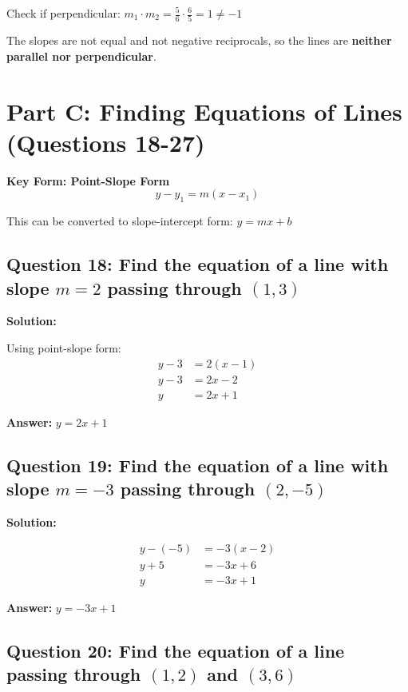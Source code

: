 \documentclass[12pt]{article}
\begin{document}
Check if perpendicular: $m_1 \cdot m_2 = \frac{5}{6} \cdot \frac{6}{5} = 1 \neq -1$

The slopes are not equal and not negative reciprocals, so the lines are \textbf{neither parallel nor perpendicular}.

\newpage

\section{Part C: Finding Equations of Lines (Questions 18-27)}

\textbf{Key Form: Point-Slope Form}
$$y - y_1 = m(x - x_1)$$

This can be converted to slope-intercept form: $y = mx + b$

\subsection*{Question 18: Find the equation of a line with slope $m = 2$ passing through $(1, 3)$}

\noindent\textbf{Solution:}

Using point-slope form:
\begin{align*}
y - 3 &= 2(x - 1) \\
y - 3 &= 2x - 2 \\
y &= 2x + 1
\end{align*}

\textbf{Answer: } $y = 2x + 1$

\vspace{0.3cm}

\subsection*{Question 19: Find the equation of a line with slope $m = -3$ passing through $(2, -5)$}

\noindent\textbf{Solution:}

\begin{align*}
y - (-5) &= -3(x - 2) \\
y + 5 &= -3x + 6 \\
y &= -3x + 1
\end{align*}

\textbf{Answer: } $y = -3x + 1$

\vspace{0.3cm}

\subsection*{Question 20: Find the equation of a line passing through $(1, 2)$ and $(3, 6)$}
\end{document}
